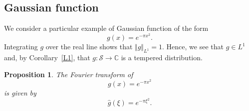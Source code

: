 \documentclass[12pt, letterpaper]{article}
\theoremstyle{plain}
\newtheorem{proposition}[theorem]{Proposition}
\begin{document}
\subsection{Gaussian function}\label{sec32}

We consider a particular example of Gaussian function of the form 
\begin{equation}
    g(x) = e^{-\pi x^2}.
\end{equation}
Integrating $g$ over the real line shows that $\Vert g \Vert_{L^1} = 1$. Hence, we see that $g \in L^1$ and, by Corollary~\ref{L1}, that $g: \mathcal{S} \to \mathbb{C}$ is a tempered distribution.

\begin{proposition}
    The Fourier transform of 
    \begin{equation}\label{g}
        g(x) = e^{-\pi x^2}
    \end{equation}
    is given by
    \begin{equation}
        \hat{g}(\xi) = e^{-\pi \xi^2}.
    \end{equation}
\end{proposition}
\end{document}
